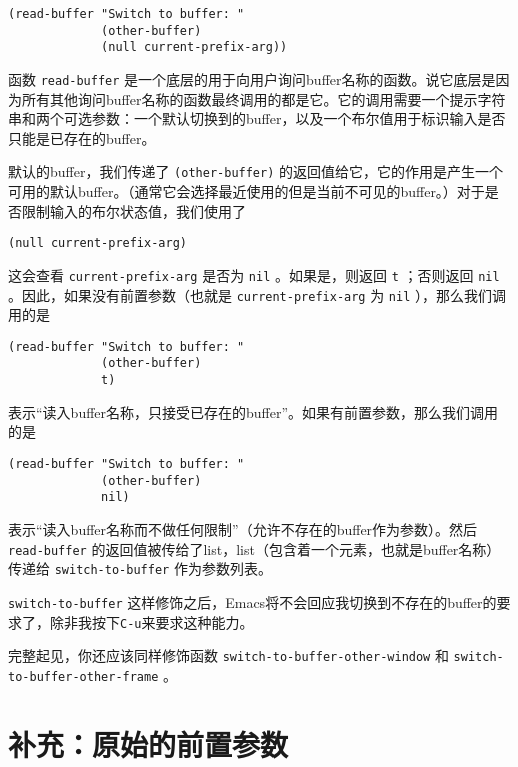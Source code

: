 \begin{verbatim}
(read-buffer "Switch to buffer: "
             (other-buffer)
             (null current-prefix-arg))
\end{verbatim}

函数 \texttt{read-buffer} 是一个底层的用于向用户询问buffer名称的函数。说它底层是因为所有其他询问buffer名称的函数最终调用的都是它。它的调用需要一个提示字符串和两个可选参数：一个默认切换到的buffer，以及一个布尔值用于标识输入是否只能是已存在的buffer。

默认的buffer，我们传递了 \texttt{(other-buffer)} 的返回值给它，它的作用是产生一个可用的默认buffer。（通常它会选择最近使用的但是当前不可见的buffer。）对于是否限制输入的布尔状态值，我们使用了

\begin{verbatim}
(null current-prefix-arg)
\end{verbatim}

这会查看 \texttt{current-prefix-arg} 是否为 \texttt{nil} 。如果是，则返回 \texttt{t} ；否则返回 \texttt{nil} 。因此，如果没有前置参数（也就是 \texttt{current-prefix-arg} 为 \texttt{nil} ），那么我们调用的是

\begin{verbatim}
(read-buffer "Switch to buffer: "
             (other-buffer)
             t)
\end{verbatim}

表示“读入buffer名称，只接受已存在的buffer”。如果有前置参数，那么我们调用的是

\begin{verbatim}
(read-buffer "Switch to buffer: "
             (other-buffer)
             nil)
\end{verbatim}

表示“读入buffer名称而不做任何限制”（允许不存在的buffer作为参数）。然后 \texttt{read-buffer} 的返回值被传给了list，list（包含着一个元素，也就是buffer名称）传递给 \texttt{switch-to-buffer} 作为参数列表。

 \texttt{switch-to-buffer} 这样修饰之后，Emacs将不会回应我切换到不存在的buffer的要求了，除非我按下\verb|C-u|来要求这种能力。

完整起见，你还应该同样修饰函数 \texttt{switch-to-buffer-other-window} 和 \texttt{switch-to-buffer-other-frame} 。

\section{补充：原始的前置参数}
\label{section:02-Addendum-Raw-Prefix-Argument}

